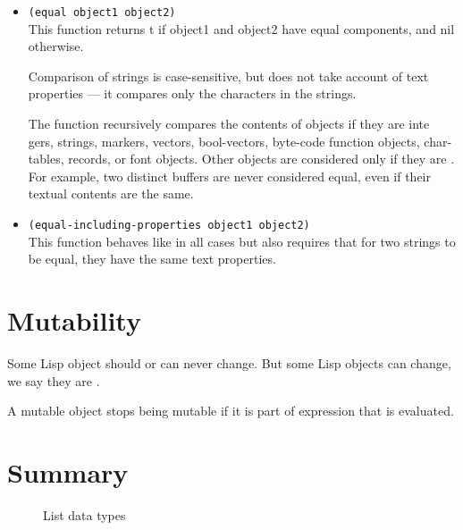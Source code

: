 \begin{itemize}[itemsep=10pt]
\item \lstinline|(equal object1 object2)|\\
  This function returns t if object1 and object2 have equal components, and nil otherwise.

  Comparison of strings is case-sensitive, but does not take account of text properties — it compares only the characters in the strings.

  The  function recursively compares the contents of objects if they are inte gers, strings, markers, vectors, bool-vectors, byte-code function objects, char-tables, records, or font objects.
  Other objects are considered  only if they are .
  For example, two distinct buffers are never considered equal, even if their textual contents are the same.

  
\item \lstinline|(equal-including-properties object1 object2)|\\
  This function behaves like  in all cases but also requires that for two strings to be equal, they have the same text properties.
  
  
\end{itemize}


\section{Mutability}
\label{sec:mutability}

Some Lisp object should or can never change.
But some Lisp objects can change, we say they are .

A mutable object stops being mutable if it is part of expression that is evaluated.


\section{Summary}
\label{sec:summary}

\begin{figure}[H]
  \centering
  \caption{List data types}
\end{figure}

